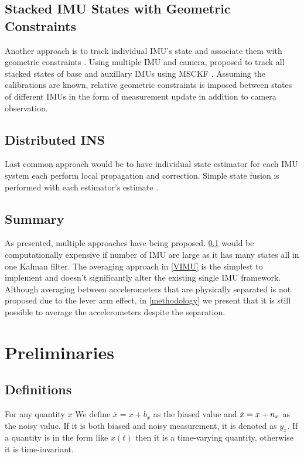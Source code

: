 \documentclass[conference]{IEEEtran}
\begin{document}
\subsection{Stacked IMU States with Geometric Constraints}\label{constraint}

Another approach is to track individual IMU's state and associate them with geometric constraints \cite{waegli2008, Beaudoin2018_satelite}. Using multiple IMU and camera, \cite{Eckenhoff2021_MIMC-VINS} proposed to track all stacked states of base and auxillary IMUs using MSCKF \cite{Anastasios2007_MSCKF}. Assuming the calibrations are known, relative geometric constraints is imposed between states of different IMUs in the form of measurement update in addition to camera observation.

\subsection{Distributed INS}\label{distributed}

Last common approach would be to have individual state estimator for each IMU system each perform local propagation and correction. Simple state fusion is performed with each estimator's estimate \cite{Bancroft2011DataFA, patel2022_multi-imu}.

\subsection{Summary}

As presented, multiple approaches have being proposed. \ref{constraint} would be computationally expensive if number of IMU are large as it has many states all in one Kalman filter. The averaging approach in \ref{VIMU} is the simplest to implement and doesn't significantly alter the existing single IMU framework. Although averaging between accelerometers that are physically separated is not proposed due to the lever arm effect, in \ref{methodology} we present that it is still possible to average the accelerometers despite the separation.

\section{Preliminaries}

\subsection{Definitions}

For any quantity $x$ We define $\bar{x} = x + b_x$ as the biased value and $\Tilde{x} = x + n_x$ as the noisy value. If it is both biased and noisy measurement, it is denoted as $y_x$. If a quantity is in the form like $x(t)$ then it is a time-varying quantity, otherwise it is time-invariant.
\end{document}
